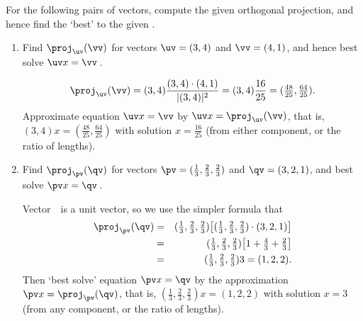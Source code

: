 \begin{example} \label{eg:projline}
For the following pairs of vectors, 
compute the given orthogonal projection, 
and hence find the `best'  to the given .
\begin{enumerate}
\item Find \(\proj_\uv(\vv)\) for vectors \(\uv=(3,4)\) and \(\vv=(4,1)\), and hence best solve \(\uv x=\vv\)\,.
\begin{solution} 
\begin{equation*}
\proj_\uv(\vv)=(3,4)\frac{(3,4)\cdot(4,1)}{|(3,4)|^2}
=(3,4)\frac{16}{25}
=(\tfrac{48}{25},\tfrac{64}{25}).
\end{equation*}
Approximate equation \(\uv x=\vv\) by \(\uv x=\proj_\uv(\vv)\), that is, \((3,4)x=(\tfrac{48}{25},\tfrac{64}{25})\) with solution \(x=\tfrac{16}{25}\) (from either component, or the ratio of lengths).
\end{solution}


\item Find \(\proj_\pv(\qv)\) for vectors \(\pv=(\tfrac13,\tfrac23,\tfrac23)\) and \(\qv=(3,2,1)\), and best solve \(\pv x=\qv\)\,.
\begin{solution} 
Vector~\pv\ is a unit vector, so we use the simpler formula that
\begin{eqnarray*}
\proj_\pv(\qv)&=& (\tfrac13,\tfrac23,\tfrac23)\big[(\tfrac13,\tfrac23,\tfrac23)\cdot(3,2,1)\big]
\\&=&(\tfrac13,\tfrac23,\tfrac23)\big[1+\tfrac43+\tfrac23\big] 
\\&=&(\tfrac13,\tfrac23,\tfrac23)3
=(1,2,2).
\end{eqnarray*}
Then `best solve' equation \(\pv x=\qv\) by the approximation \(\pv x=\proj_\pv(\qv)\), that is, \((\tfrac13,\tfrac23,\tfrac23)x=(1,2,2)\) with solution \(x=3\) (from any component, or the ratio of lengths).
\end{solution}
\end{enumerate}
\end{example}




